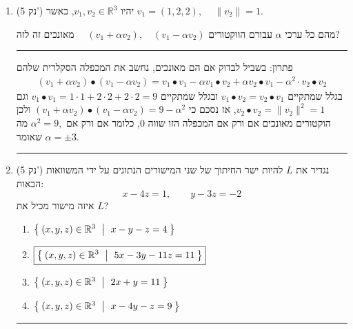 \documentclass[12pt, a4paper]{article}
\newcommand{\rr}{\mathbb{R}}
\newcommand{\points}[1]{(#1 נק') }
\begin{document}
\begin{enumerate}
\noindent\rule{\textwidth-30pt}{0.4pt}

\item\points{5}
יהיו \(v_1,v_2\in\mathbb{R}^3\), כאשר
$
v_1=
(
1,2,2)$,
\ \ 
$\|v_2\|=1$.

מהם כל ערכי  \(\alpha\) עבורם הווקטורים
\((v_1+\alpha v_2),\quad (v_1-\alpha v_2)\) \ \ 
מאונכים זה לזה?

\begin{enumerate}
\end{enumerate}

\noindent\rule{\textwidth-30pt}{0.4pt}

פתרון:
 בשביל לבדוק אם הם מאונכים, נחשב את המכפלה הסקלרית שלהם
 \begin{align*}
     (v_1+\alpha v_2)\bullet (v_1-\alpha v_2)=v_1\bullet v_1-\alpha v_1\bullet v_2+\alpha v_2\bullet v_1 -\alpha^2\cdot v_2\bullet v_2
 \end{align*}
 בגלל שמתקיים
 $v_1\bullet v_2=v_2\bullet v_1$
 ובגלל שמתקיים
 $v_1\bullet v_1=1\cdot 1+2\cdot 2+2\cdot 2=9$
 וגם
 $v_2\bullet v_2=\|v_2\|^2=1$,
 אז נסכם כי
 $ (v_1+\alpha v_2)\bullet (v_1-\alpha v_2)=9-\alpha^2$
 ולכן הוקטורים מאונכים אם ורק אם המכפלה הזו שווה 
 $0$,
 כלומר אם ורק אם
 $\alpha^2=9,$
 מה שאומר
 $\alpha=\pm3$.
 
\noindent\rule{\textwidth-30pt}{0.4pt}




\item\points{5}
נגדיר את $L$
להיות ישר החיתוך של שני המישורים הנתונים על ידי המשוואות הבאות:
\[
x-4z=1,\qquad
y-3z=-2
\]
איזה מישור מכיל את $L$?

\begin{enumerate}
\item $\Set{(x,y,z)\in \rr^3\ |\ x-y-z = 4}$
\item $\boxed{\Set{(x,y,z)\in \rr^3\ |\ 5x-3y-11z=11}}$
\item $\Set{(x,y,z)\in \rr^3\ |\ 2x+y=11}$
\item $\Set{(x,y,z)\in \rr^3\ |\ x-4y-z=9}$
\end{enumerate}

\noindent\rule{\textwidth-30pt}{0.4pt}



\end{enumerate}
\end{document}
